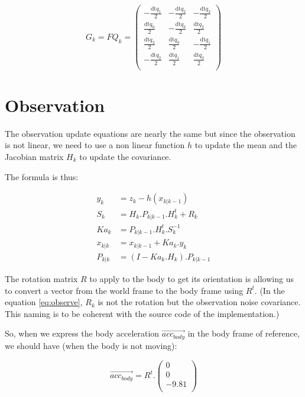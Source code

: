 \documentclass[titlepage,a4,12pt]{article}
\numberwithin{equation}{subsection}
\newcommand{\before}[1]{#1_{k|k-1}}
\newcommand{\after}[1]{#1_{k|k}}
\begin{document}
\begin{equation}\label{eq:Gmatrix}
G_k = FQ_k =\left(
\begin{array}{ccc}
 -\frac{\text{dt} q_1}{2} & -\frac{\text{dt} q_2}{2} & -\frac{\text{dt} q_3}{2} \\
 \frac{\text{dt} q_0}{2} & -\frac{\text{dt} q_3}{2} & \frac{\text{dt} q_2}{2} \\
 \frac{\text{dt} q_3}{2} & \frac{\text{dt} q_0}{2} & -\frac{\text{dt} q_1}{2} \\
 -\frac{\text{dt} q_2}{2} & \frac{\text{dt} q_1}{2} & \frac{\text{dt} q_0}{2} \\
\end{array}
\right)
\end{equation}

\section{Observation}

The observation update equations are nearly the same but since the observation is not linear, we need to use a non linear function $h$ to update the mean and the Jacobian matrix $H_k$ to update the covariance.

The formula is thus:

\begin{align}\label{eq:observe}
y_k &= z_k - h(\before{x})\\
S_k &= H_k . \before{P} . H_k^t + R_k\\
Ka_k&= \before{P} . H_k^t . S^{-1}_k \\
\after{x} &= \before{x} + Ka_k . y_k \\ 
\after{P} &= (I - Ka_k . H_k) . \before{P}
\end{align}

The rotation matrix $R$ to apply to the body to get its orientation is allowing us to convert a vector from the world frame to the body frame using $R^t$.
(In the equation \ref{eq:observe}, $R_k$ is not the rotation but the observation noise covariance. This naming is to be coherent with the source code of the implementation.)


So, when we express the body acceleration $\overrightarrow{acc_{body}}$ in the body frame of reference, we should have (when the body is not moving):

\begin{equation}\label{eq:accworld}
\overrightarrow{acc_{body}} = R^t . \left(
\begin{array}{c}
 0 \\
 0 \\
 -9.81 \\
\end{array}
\right)
\end{equation}
\end{document}
